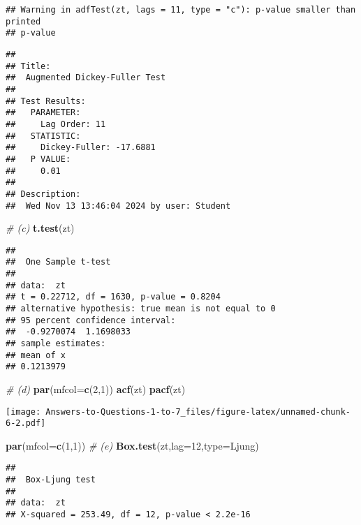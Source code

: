 \documentclass[
]{article}
\newenvironment{Shaded}{\begin{snugshade}}{\end{snugshade}}
\newcommand{\AttributeTok}[1]{\textcolor[rgb]{0.13,0.29,0.53}{#1}}
\newcommand{\CommentTok}[1]{\textcolor[rgb]{0.56,0.35,0.01}{\textit{#1}}}
\newcommand{\DecValTok}[1]{\textcolor[rgb]{0.00,0.00,0.81}{#1}}
\newcommand{\FunctionTok}[1]{\textcolor[rgb]{0.13,0.29,0.53}{\textbf{#1}}}
\newcommand{\NormalTok}[1]{#1}
\newcommand{\StringTok}[1]{\textcolor[rgb]{0.31,0.60,0.02}{#1}}
\begin{document}
\begin{verbatim}
## Warning in adfTest(zt, lags = 11, type = "c"): p-value smaller than printed
## p-value
\end{verbatim}

\begin{verbatim}
## 
## Title:
##  Augmented Dickey-Fuller Test
## 
## Test Results:
##   PARAMETER:
##     Lag Order: 11
##   STATISTIC:
##     Dickey-Fuller: -17.6881
##   P VALUE:
##     0.01 
## 
## Description:
##  Wed Nov 13 13:46:04 2024 by user: Student
\end{verbatim}

\begin{Shaded}
\begin{Highlighting}[]
\CommentTok{\# (c)}
\FunctionTok{t.test}\NormalTok{(zt)}
\end{Highlighting}
\end{Shaded}

\begin{verbatim}
## 
##  One Sample t-test
## 
## data:  zt
## t = 0.22712, df = 1630, p-value = 0.8204
## alternative hypothesis: true mean is not equal to 0
## 95 percent confidence interval:
##  -0.9270074  1.1698033
## sample estimates:
## mean of x 
## 0.1213979
\end{verbatim}

\begin{Shaded}
\begin{Highlighting}[]
\CommentTok{\# (d)}
\FunctionTok{par}\NormalTok{(}\AttributeTok{mfcol=}\FunctionTok{c}\NormalTok{(}\DecValTok{2}\NormalTok{,}\DecValTok{1}\NormalTok{))}
\FunctionTok{acf}\NormalTok{(zt)}
\FunctionTok{pacf}\NormalTok{(zt)}
\end{Highlighting}
\end{Shaded}

\texttt{[image: Answers-to-Questions-1-to-7\_files/figure-latex/unnamed-chunk-6-2.pdf]}

\begin{Shaded}
\begin{Highlighting}[]
\FunctionTok{par}\NormalTok{(}\AttributeTok{mfcol=}\FunctionTok{c}\NormalTok{(}\DecValTok{1}\NormalTok{,}\DecValTok{1}\NormalTok{))}
\CommentTok{\# (e)}
\FunctionTok{Box.test}\NormalTok{(zt,}\AttributeTok{lag=}\DecValTok{12}\NormalTok{,}\AttributeTok{type=}\StringTok{\textquotesingle{}Ljung\textquotesingle{}}\NormalTok{)}
\end{Highlighting}
\end{Shaded}

\begin{verbatim}
## 
##  Box-Ljung test
## 
## data:  zt
## X-squared = 253.49, df = 12, p-value < 2.2e-16
\end{verbatim}
\end{document}
